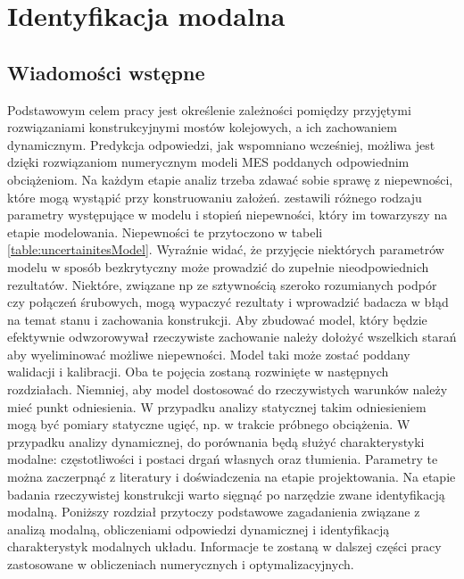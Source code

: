 \chapter{Identyfikacja modalna}

\section{Wiadomości wstępne} \label{section: modalAnalysisIntro}
Podstawowym celem pracy jest określenie zależności pomiędzy przyjętymi rozwiązaniami konstrukcyjnymi mostów kolejowych, a ich zachowaniem dynamicznym. Predykcja odpowiedzi, jak wspomniano wcześniej, możliwa jest dzięki rozwiązaniom numerycznym modeli MES poddanych odpowiednim obciążeniom. Na każdym etapie analiz trzeba zdawać sobie sprawę z niepewności, które mogą wystąpić przy konstruowaniu założeń. \cite{Brincker2015} zestawili różnego rodzaju parametry występujące w modelu i stopień niepewności, który im towarzyszy na etapie modelowania. Niepewności te przytoczono w tabeli \ref{table:uncertainitesModel}. Wyraźnie widać, że przyjęcie niektórych parametrów modelu w sposób bezkrytyczny może prowadzić do zupełnie nieodpowiednich rezultatów. Niektóre, związane np ze sztywnością szeroko rozumianych podpór czy połączeń śrubowych, mogą wypaczyć rezultaty i wprowadzić badacza w błąd na temat stanu i zachowania konstrukcji. Aby zbudować model, który będzie efektywnie odwzorowywał rzeczywiste zachowanie należy dołożyć wszelkich starań aby wyeliminować możliwe niepewności. Model taki może zostać poddany walidacji i kalibracji. Oba te pojęcia zostaną rozwinięte w następnych rozdziałach. Niemniej, aby model dostosować do rzeczywistych warunków należy mieć punkt odniesienia. W przypadku analizy statycznej takim odniesieniem mogą być pomiary statyczne ugięć, np. w trakcie próbnego obciążenia. W przypadku analizy dynamicznej, do porównania będą służyć charakterystyki modalne: częstotliwości i postaci drgań własnych oraz tłumienia. Parametry te można zaczerpnąć z literatury i doświadczenia na etapie projektowania. Na etapie badania rzeczywistej konstrukcji warto sięgnąć po narzędzie zwane identyfikacją modalną. Poniższy rozdział przytoczy podstawowe zagadanienia związane z analizą modalną, obliczeniami odpowiedzi dynamicznej i identyfikacją charakterystyk modalnych układu. Informacje te zostaną w dalszej części pracy zastosowane w obliczeniach numerycznych i optymalizacyjnych.



